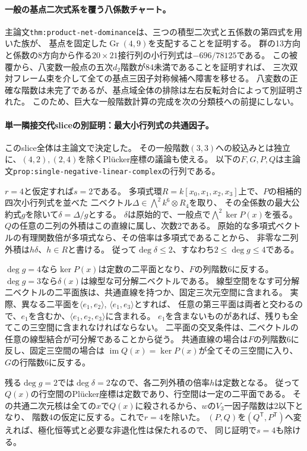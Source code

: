 \documentclass[11pt,a4paper]{ltjsarticle}
\begin{document}
\paragraph{一般の基点二次式系を覆う八係数チャート。}
主論文\texttt{thm:product-net-dominance}は、三つの積型二次式と五係数の第四式を用いた族が、
基点を固定した$\operatorname{Gr}(4,9)$を支配することを証明する。
群の13方向と係数の8方向から作る$20\times21$接行列の小行列式は$-696/78125$である。
この被覆から、八変数一般点の五次$d_2$階数が84未満であることを証明すれば、
三次双対フレーム束を介して全ての基点三因子対称候補へ障害を移せる。
八変数の正確な階数は未完了であるが、基点域全体の排除は左右反転対合によって別証明された。
このため、巨大な一般階数計算の完成を次の分類枝への前提にしない。

\paragraph{単一隣接交代sliceの別証明：最大小行列式の共通因子。}
このslice全体は主論文で決定した。
その一般階数$(3,3)$への絞込みとは独立に、$(4,2),(2,4)$を除くPl\"ucker座標の議論も使える。
以下の$F,G,P,Q$は主論文\texttt{prop:single-negative-linear-complex}の行列である。

$r=4$と仮定すれば$s=2$である。
多項式環$R=k[x_0,x_1,x_2,x_3]$上で、$P$の相補的四次小行列式を並べた
二ベクトル$\Delta\in\bigwedge^2 k^6\otimes R_4$を取り、
その全係数の最大公約式$g$を除いて$\delta=\Delta/g$とする。
$\delta$は原始的で、一般点で$\bigwedge^2\ker P(x)$を張る。
$Q$の任意の二列の外積はこの直線に属し、次数2である。
原始的な多項式ベクトルの有理関数倍が多項式なら、その倍率は多項式であることから、
非零な二列外積は$h\delta$、$h\in R$と書ける。
従って$\deg\delta\leq2$、すなわち$2\leq\deg g\leq4$である。

$\deg g=4$なら$\ker P(x)$は定数の二平面となり、$F$の列階数6に反する。
$\deg g=3$なら$\delta(x)$は線型な可分解二ベクトルである。
線型空間をなす可分解二ベクトルの二平面族は、共通直線を持つか、固定三次元空間に含まれる。
実際、異なる二平面を$\langle e_1,e_2\rangle$, $\langle e_1,e_3\rangle$とすれば、
任意の第三平面は両者と交わるので、$e_1$を含むか、$\langle e_1,e_2,e_3\rangle$に含まれる。
$e_1$を含まないものがあれば、残りも全てこの三空間に含まれなければならない。
二平面の交叉条件は、二ベクトルの任意の線型結合が可分解であることから従う。
共通直線の場合は$F$の列階数6に反し、固定三空間の場合は
$\operatorname{im}Q(x)=\ker P(x)$が全てその三空間に入り、$G$の行階数6に反する。

残る$\deg g=2$では$\deg\delta=2$なので、各二列外積の倍率$h$は定数となる。
従って$Q(x)$の行空間のPl\"ucker座標は定数であり、行空間は一定の二平面である。
その共通二次元核は全ての$x$で$Q(x)$に殺されるから、$w$の$V_3$一因子階数は2以下となり、
階数4の仮定に反する。これで$r=4$を除いた。
$(P,Q)$を$(Q^{\mathsf T},P^{\mathsf T})$へ変えれば、極化恒等式と必要な非退化性は保たれるので、
同じ証明で$s=4$も除ける。
\end{document}

